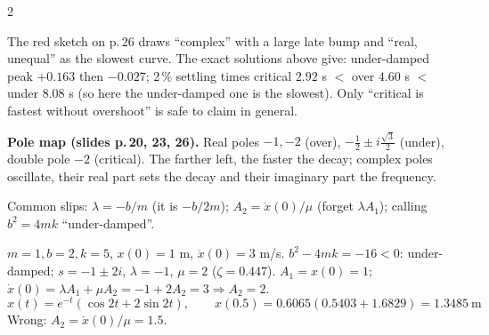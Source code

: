\begin{multicols}{2}
\begin{slideerr}
The red sketch on p.\,26 draws ``complex'' with a large late bump and ``real, unequal'' as the slowest curve. The exact solutions above give: under-damped peak $+0.163$ then $-0.027$; 2\,\% settling times critical $2.92$ s $<$ over $4.60$ s $<$ under $8.08$ s (so here the under-damped one is the slowest). Only ``critical is fastest without overshoot'' is safe to claim in general. \chk
\end{slideerr}
\begin{center}
\end{center}
\textbf{Pole map (slides p.\,20, 23, 26).} Real poles $-1,-2$ (over), $-\tfrac12\pm i\tfrac{\sqrt3}2$ (under), double pole $-2$ (critical). The farther left, the faster the decay; complex poles oscillate, their real part sets the decay and their imaginary part the frequency.
\begin{trap}
Common slips: $\lambda=-b/m$ (it is $-b/2m$); $A_2=\dot x(0)/\mu$ (forget $\lambda A_1$); calling $b^2=4mk$ ``under-damped''.
\end{trap}
\begin{worked}
$m=1,b=2,k=5$, $x(0)=1$ m, $\dot x(0)=3$ m/s. $b^2-4mk=-16<0$: under-damped; $s=-1\pm2i$, $\lambda=-1$, $\mu=2$ ($\zeta=0.447$). $A_1=x(0)=1$; $\dot x(0)=\lambda A_1+\mu A_2=-1+2A_2=3\Rightarrow A_2=2$.
\[x(t)=e^{-t}(\cos2t+2\sin2t),\qquad x(0.5)=0.6065(0.5403+1.6829)=1.3485\ \text{m}\]
Wrong: $A_2=\dot x(0)/\mu=1.5$.
\end{worked}


\end{multicols}
